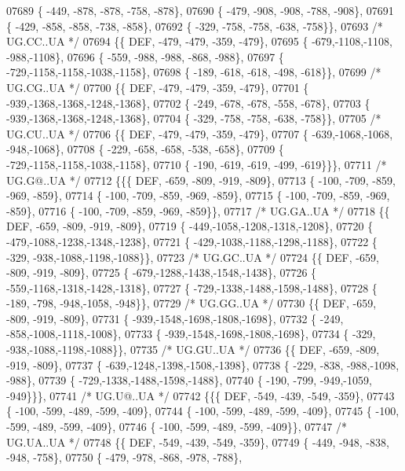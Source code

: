 \begin{DoxyCode}
07689 \{ -449, -878, -878, -758, -878\},
07690 \{ -479, -908, -908, -788, -908\},
07691 \{ -429, -858, -858, -738, -858\},
07692 \{ -329, -758, -758, -638, -758\}\},
07693 \textcolor{comment}{/* UG.CC..UA */}
07694 \{\{  DEF, -479, -479, -359, -479\},
07695 \{ -679,-1108,-1108, -988,-1108\},
07696 \{ -559, -988, -988, -868, -988\},
07697 \{ -729,-1158,-1158,-1038,-1158\},
07698 \{ -189, -618, -618, -498, -618\}\},
07699 \textcolor{comment}{/* UG.CG..UA */}
07700 \{\{  DEF, -479, -479, -359, -479\},
07701 \{ -939,-1368,-1368,-1248,-1368\},
07702 \{ -249, -678, -678, -558, -678\},
07703 \{ -939,-1368,-1368,-1248,-1368\},
07704 \{ -329, -758, -758, -638, -758\}\},
07705 \textcolor{comment}{/* UG.CU..UA */}
07706 \{\{  DEF, -479, -479, -359, -479\},
07707 \{ -639,-1068,-1068, -948,-1068\},
07708 \{ -229, -658, -658, -538, -658\},
07709 \{ -729,-1158,-1158,-1038,-1158\},
07710 \{ -190, -619, -619, -499, -619\}\}\},
07711 \textcolor{comment}{/* UG.G@..UA */}
07712 \{\{\{  DEF, -659, -809, -919, -809\},
07713 \{ -100, -709, -859, -969, -859\},
07714 \{ -100, -709, -859, -969, -859\},
07715 \{ -100, -709, -859, -969, -859\},
07716 \{ -100, -709, -859, -969, -859\}\},
07717 \textcolor{comment}{/* UG.GA..UA */}
07718 \{\{  DEF, -659, -809, -919, -809\},
07719 \{ -449,-1058,-1208,-1318,-1208\},
07720 \{ -479,-1088,-1238,-1348,-1238\},
07721 \{ -429,-1038,-1188,-1298,-1188\},
07722 \{ -329, -938,-1088,-1198,-1088\}\},
07723 \textcolor{comment}{/* UG.GC..UA */}
07724 \{\{  DEF, -659, -809, -919, -809\},
07725 \{ -679,-1288,-1438,-1548,-1438\},
07726 \{ -559,-1168,-1318,-1428,-1318\},
07727 \{ -729,-1338,-1488,-1598,-1488\},
07728 \{ -189, -798, -948,-1058, -948\}\},
07729 \textcolor{comment}{/* UG.GG..UA */}
07730 \{\{  DEF, -659, -809, -919, -809\},
07731 \{ -939,-1548,-1698,-1808,-1698\},
07732 \{ -249, -858,-1008,-1118,-1008\},
07733 \{ -939,-1548,-1698,-1808,-1698\},
07734 \{ -329, -938,-1088,-1198,-1088\}\},
07735 \textcolor{comment}{/* UG.GU..UA */}
07736 \{\{  DEF, -659, -809, -919, -809\},
07737 \{ -639,-1248,-1398,-1508,-1398\},
07738 \{ -229, -838, -988,-1098, -988\},
07739 \{ -729,-1338,-1488,-1598,-1488\},
07740 \{ -190, -799, -949,-1059, -949\}\}\},
07741 \textcolor{comment}{/* UG.U@..UA */}
07742 \{\{\{  DEF, -549, -439, -549, -359\},
07743 \{ -100, -599, -489, -599, -409\},
07744 \{ -100, -599, -489, -599, -409\},
07745 \{ -100, -599, -489, -599, -409\},
07746 \{ -100, -599, -489, -599, -409\}\},
07747 \textcolor{comment}{/* UG.UA..UA */}
07748 \{\{  DEF, -549, -439, -549, -359\},
07749 \{ -449, -948, -838, -948, -758\},
07750 \{ -479, -978, -868, -978, -788\},

\end{DoxyCode}
